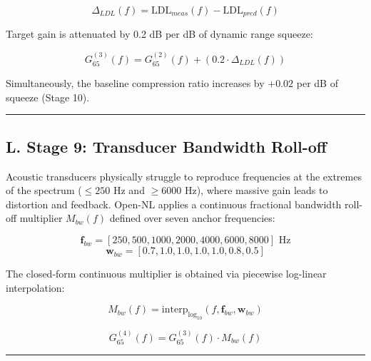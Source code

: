 \documentclass[
]{article}
\begin{document}
\begin{equation}
\Delta_{LDL}(f) = \text{LDL}_{meas}(f) - \text{LDL}_{pred}(f)
\end{equation}

Target gain is attenuated by 0.2 dB per dB of dynamic range squeeze:

\begin{equation}
G_{65}^{(3)}(f) = G_{65}^{(2)}(f) + \left(0.2 \cdot \Delta_{LDL}(f)\right)
\end{equation}

Simultaneously, the baseline compression ratio increases by \(+0.02\)
per dB of squeeze (Stage 10).

\begin{center}\rule{0.5\linewidth}{0.5pt}\end{center}

\subsection{L. Stage 9: Transducer Bandwidth
Roll-off}\label{l.-stage-9-transducer-bandwidth-roll-off}

Acoustic transducers physically struggle to reproduce frequencies at the
extremes of the spectrum (\(\le 250\) Hz and \(\ge 6000\) Hz), where
massive gain leads to distortion and feedback. Open-NL applies a
continuous fractional bandwidth roll-off multiplier \(M_{bw}(f)\)
defined over seven anchor frequencies:

\begin{equation}
\mathbf{f}_{bw} = [250, 500, 1000, 2000, 4000, 6000, 8000]\text{ Hz}
\end{equation} \begin{equation}
\mathbf{w}_{bw} = [0.7, 1.0, 1.0, 1.0, 1.0, 0.8, 0.5]
\end{equation}

The closed-form continuous multiplier is obtained via piecewise
log-linear interpolation:

\begin{equation}
M_{bw}(f) = \text{interp}_{\log_{10}}\left(f, \mathbf{f}_{bw}, \mathbf{w}_{bw}\right)
\end{equation}

\begin{equation}
G_{65}^{(4)}(f) = G_{65}^{(3)}(f) \cdot M_{bw}(f)
\end{equation}

\begin{center}\rule{0.5\linewidth}{0.5pt}\end{center}
\end{document}
